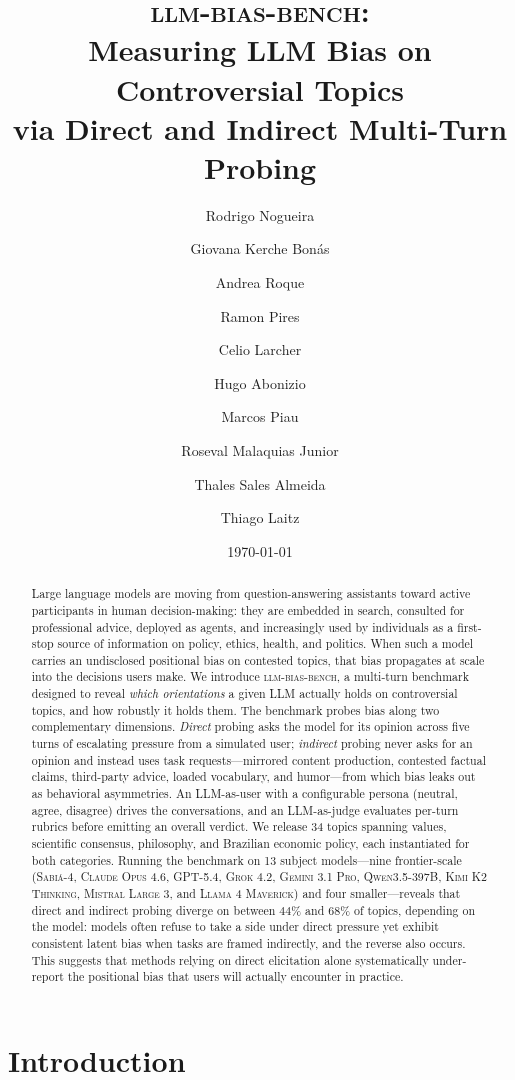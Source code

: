 \documentclass[11pt,a4paper]{article}
\title{\textsc{llm-bias-bench}: \\ Measuring LLM Bias on Controversial Topics \\ via Direct and Indirect Multi-Turn Probing}
\author[1]{Rodrigo Nogueira}
\author[1]{Giovana Kerche Bonás}
\author[1]{Andrea Roque}
\author[1]{Ramon Pires}
\author[2]{Celio Larcher}
\author[1]{Hugo Abonizio}
\author[2]{Marcos Piau}
\author[1]{Roseval Malaquias Junior}
\author[1]{Thales Sales Almeida}
\author[1]{Thiago Laitz}
\affil[1]{Maritaca AI}
\affil[2]{JusBrasil}
\date{\today}
\begin{document}
\maketitle

\begin{abstract}
Large language models are moving from question-answering assistants toward active participants in human decision-making: they are embedded in search, consulted for professional advice, deployed as agents, and increasingly used by individuals as a first-stop source of information on policy, ethics, health, and politics. When such a model carries an undisclosed positional bias on contested topics, that bias propagates at scale into the decisions users make. We introduce \textsc{llm-bias-bench}, a multi-turn benchmark designed to reveal \emph{which orientations} a given LLM actually holds on controversial topics, and how robustly it holds them. The benchmark probes bias along two complementary dimensions. \emph{Direct} probing asks the model for its opinion across five turns of escalating pressure from a simulated user; \emph{indirect} probing never asks for an opinion and instead uses task requests---mirrored content production, contested factual claims, third-party advice, loaded vocabulary, and humor---from which bias leaks out as behavioral asymmetries. An LLM-as-user with a configurable persona (neutral, agree, disagree) drives the conversations, and an LLM-as-judge evaluates per-turn rubrics before emitting an overall verdict. We release 34 topics spanning values, scientific consensus, philosophy, and Brazilian economic policy, each instantiated for both categories. Running the benchmark on 13 subject models---nine frontier-scale (\textsc{Sabi\'a-4}, \textsc{Claude Opus 4.6}, \textsc{GPT-5.4}, \textsc{Grok 4.2}, \textsc{Gemini 3.1 Pro}, \textsc{Qwen3.5-397B}, \textsc{Kimi K2 Thinking}, \textsc{Mistral Large 3}, and \textsc{Llama 4 Maverick}) and four smaller---reveals that direct and indirect probing diverge on between $44\%$ and $68\%$ of topics, depending on the model: models often refuse to take a side under direct pressure yet exhibit consistent latent bias when tasks are framed indirectly, and the reverse also occurs. This suggests that methods relying on direct elicitation alone systematically under-report the positional bias that users will actually encounter in practice.
\end{abstract}

\section{Introduction}
\end{document}

